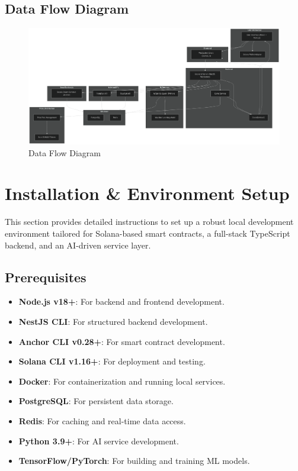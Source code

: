 \documentclass[11pt,a4paper]{article}
\begin{document}
\subsection{Data Flow Diagram}

\begin{figure}[H]
    \centering
    \includegraphics[width=\textwidth]{data_flow_diagram.pdf}
    \caption{Data Flow Diagram}
    \label{fig:data_flow}
\end{figure}

\section{Installation \& Environment Setup}

This section provides detailed instructions to set up a robust local development environment tailored for Solana-based smart contracts, a full-stack TypeScript backend, and an AI-driven service layer.

\subsection{Prerequisites}

\begin{itemize}
    \item \textbf{Node.js v18+}: For backend and frontend development.
    \item \textbf{NestJS CLI}: For structured backend development.
    \item \textbf{Anchor CLI v0.28+}: For smart contract development.
    \item \textbf{Solana CLI v1.16+}: For deployment and testing.
    \item \textbf{Docker}: For containerization and running local services.
    \item \textbf{PostgreSQL}: For persistent data storage.
    \item \textbf{Redis}: For caching and real-time data access.
    \item \textbf{Python 3.9+}: For AI service development.
    \item \textbf{TensorFlow/PyTorch}: For building and training ML models.
\end{itemize}
\end{document}

